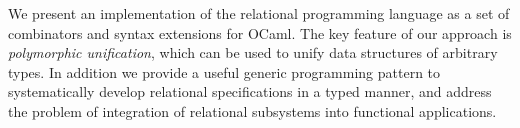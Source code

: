 

We present an implementation of the relational programming language \miniKanren{} as a set
of combinators and syntax extensions for OCaml. The key feature of our approach is
\emph{polymorphic unification}, which can be used to unify data structures of arbitrary types.
In addition we provide a useful generic programming pattern to systematically develop relational
specifications in a typed manner, and address the problem of integration of relational subsystems into
functional applications.